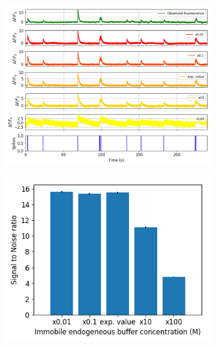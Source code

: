 \documentclass[a4paper,12pt]{article}
\theoremstyle{definition}
\begin{document}
\begin{figure}
  \begin{subfigure}{\textwidth}
	   \includegraphics[width=\linewidth]{figures/immobile_perturbed_fluorescence_18_paper.png}
     \caption{}
  \end{subfigure}
  \begin{subfigure}{0.5\textwidth}
	   \includegraphics[width=\linewidth]{figures/immobile_perturbed_snr.png}
     \caption{}
  \end{subfigure}
  \begin{subfigure}{0.5\textwidth}

\end{subfigure}
\end{figure}
\end{document}
